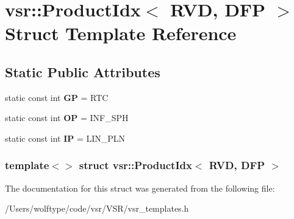 \hypertarget{structvsr_1_1_product_idx_3_01_r_v_d_00_01_d_f_p_01_4}{\section{vsr\-:\-:Product\-Idx$<$ R\-V\-D, D\-F\-P $>$ Struct Template Reference}
\label{structvsr_1_1_product_idx_3_01_r_v_d_00_01_d_f_p_01_4}
}
\subsection*{Static Public Attributes}
\begin{DoxyCompactItemize}
\item 
\hypertarget{structvsr_1_1_product_idx_3_01_r_v_d_00_01_d_f_p_01_4_a50977e3fd2cfc5e4acecad6d1fd2200c}{static const int {\bfseries G\-P} = R\-T\-C}\label{structvsr_1_1_product_idx_3_01_r_v_d_00_01_d_f_p_01_4_a50977e3fd2cfc5e4acecad6d1fd2200c}

\item 
\hypertarget{structvsr_1_1_product_idx_3_01_r_v_d_00_01_d_f_p_01_4_ae4adf0fe2dff7f84d7d9be6e10f309fd}{static const int {\bfseries O\-P} = I\-N\-F\-\_\-\-S\-P\-H}\label{structvsr_1_1_product_idx_3_01_r_v_d_00_01_d_f_p_01_4_ae4adf0fe2dff7f84d7d9be6e10f309fd}

\item 
\hypertarget{structvsr_1_1_product_idx_3_01_r_v_d_00_01_d_f_p_01_4_ae54861ad7d49476c3d2a45a43809873d}{static const int {\bfseries I\-P} = L\-I\-N\-\_\-\-P\-L\-N}\label{structvsr_1_1_product_idx_3_01_r_v_d_00_01_d_f_p_01_4_ae54861ad7d49476c3d2a45a43809873d}

\end{DoxyCompactItemize}
\subsubsection*{template$<$$>$ struct vsr\-::\-Product\-Idx$<$ R\-V\-D, D\-F\-P $>$}



The documentation for this struct was generated from the following file\-:\begin{DoxyCompactItemize}
\item 
/\-Users/wolftype/code/vsr/\-V\-S\-R/vsr\-\_\-templates.\-h\end{DoxyCompactItemize}
